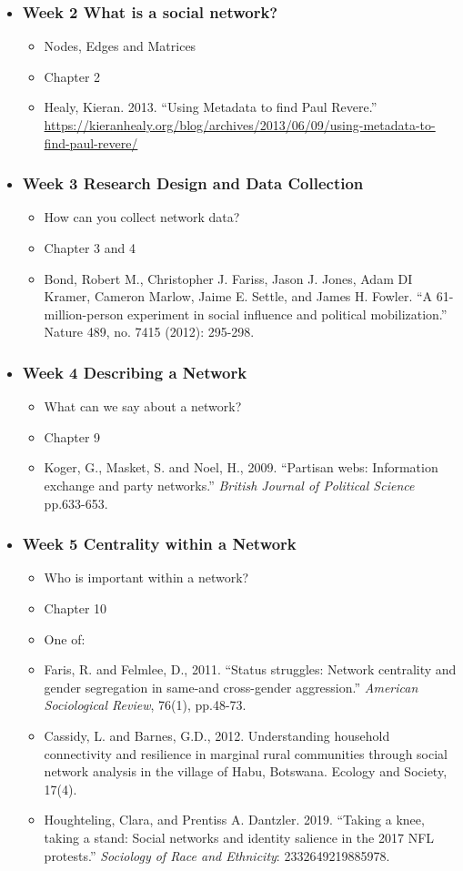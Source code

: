\documentclass[11pt]{article}
\newenvironment{courseday}[2]{
\begin{itemize}
	\item[] \subsubsection*{\textbf{#1} #2}
	\begin{itemize}
}{
\end{itemize}
\end{itemize}
}
\begin{document}
\begin{courseday}{Week 2}{What is a social network?}
	\item[] Nodes, Edges and Matrices
	\item[] Chapter 2
	\item[] Healy, Kieran. 2013. ``Using Metadata to find Paul Revere.'' \url{https://kieranhealy.org/blog/archives/2013/06/09/using-metadata-to-find-paul-revere/} 
\end{courseday}


\begin{courseday}{Week 3}{Research Design and Data Collection}
	\item[] How can you collect network data? 
	\item[] Chapter 3 and 4
	\item[] Bond, Robert M., Christopher J. Fariss, Jason J. Jones, Adam DI Kramer, Cameron Marlow, Jaime E. Settle, and James H. Fowler. ``A 61-million-person experiment in social influence and political mobilization.'' Nature 489, no. 7415 (2012): 295-298.
\end{courseday}


\begin{courseday}{Week 4}{Describing a Network}
	\item[]  What can we say about a network?
	\item[] Chapter 9
	\item[] Koger, G., Masket, S. and Noel, H., 2009. ``Partisan webs: Information exchange and party networks.'' \textit{British Journal of Political Science} pp.633-653.
\end{courseday}

\begin{courseday}{Week 5}{Centrality within a Network}
	\item[]  Who is important within a network?
	\item[] Chapter 10
	\item[] One of:
	\item Faris, R. and Felmlee, D., 2011. ``Status struggles: Network centrality and gender segregation in same-and cross-gender aggression.'' \textit{American Sociological Review}, 76(1), pp.48-73.
	\item Cassidy, L. and Barnes, G.D., 2012. Understanding household connectivity and resilience in marginal rural communities through social network analysis in the village of Habu, Botswana. Ecology and Society, 17(4).
	\item Houghteling, Clara, and Prentiss A. Dantzler. 2019. ``Taking a knee, taking a stand: Social networks and identity salience in the 2017 NFL protests.'' \textit{Sociology of Race and Ethnicity}: 2332649219885978.
\end{courseday}
\end{document}
